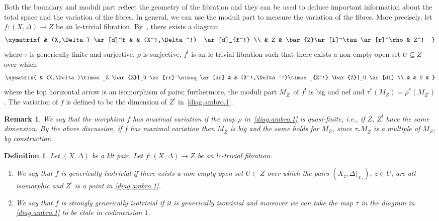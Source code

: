 \documentclass{amsart}[12pt,a4paper]
\newtheorem{definition}[theorem]{Definition}
\newtheorem{remark}[theorem]{Remark}
\theoremstyle{definition}
\begin{document}
Both the boundary and moduli part reflect the geometry of the fibration and they can be used to deduce important information about the total space and the variation of the fibres. 
In general, we can use the moduli part to measure the variation of the fibres. 
More precisely, let $f\colon (X,\Delta)\rightarrow Z$ be an lc-trivial fibration. 
By~\cite[Theorem~3.3]{Amb05}, there exists a diagram 
\begin{equation}
\label{diag.ambro.1}
	\xymatrix{
		& (X,\Delta) \ar[d]^f & & (X^!,\Delta^!) \ar[d]_{f^!} \\
		& Z &  \bar{Z}\ar[l]^\tau \ar[r]^\rho  & Z^!	
	} 
\end{equation}
\noindent where $\tau$ is generically finite and surjective, $\rho$ is surjective, $f^!$ is an lc-trivial fibration such that there exists a non-empty open set $U\subseteq \bar{Z}$ over which
\begin{align}
\label{diag.ambro.2}
\xymatrix{
			& (X,\Delta)\times_Z \bar{Z}|_U \ar[rr]^\simeq \ar[dr] & & (X^!,\Delta^!)\times_{Z^!} \bar{Z}|_U \ar[dl] \\
			&  & U  & 	
		} 
\end{align}
where the top horizontal arrow is an isomorphism of pairs;
furthermore, the moduli part $M_{Z^!}$ of $f^!$ is big and nef and $\tau^* (M_Z)=\rho^*(M_{Z^!})$. 
The variation of $f$ is defined to be the dimension of $Z^!$ in~\eqref{diag.ambro.1}.

\begin{remark}
\label{rmk.max.var}
We say that the morphism $f$ has maximal variation if the map $\rho$ in~\eqref{diag.ambro.1} is quasi-finite, i.e., if $Z$, $Z^!$ have the same dimension. 
By the above discussion, if $f$ has maximal variation then $M_{\overline Z}$ is big and the same holds for $M_Z$, since $\tau_\ast M_{\overline{Z}}$ is a multiple of $M_Z$, by construction.
\end{remark}

\begin{definition}
\label{def.isotrivial}
Let $(X,\Delta)$ be a klt pair.
Let $f\colon (X, \Delta)\rightarrow Z$ be an lc-trivial fibration.
\begin{enumerate}
\item[(i)]   
We say that $f$ is generically isotrivial if there exists a non-empty open set $U \subset Z$ over which the pairs $(X_z, \Delta\vert_{X_z})$, $z \in U$, are all isomorphic and $Z^!$ is a point in \eqref{diag.ambro.1}.
\item[(ii)] 
We say that $f$ is strongly generically isotrivial if it is generically isotrivial and moreover we can take the map $\tau$ in the diagram in \eqref{diag.ambro.1} to be \'etale in codimension $1$.
\end{enumerate}
\end{definition}
\end{document}
